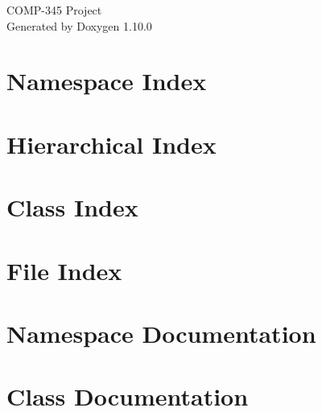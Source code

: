 \documentclass[twoside]{book}
\newcommand{\+}{\discretionary{\mbox{\scriptsize$\hookleftarrow$}}{}{}}
\newcommand{\clearemptydoublepage}{%
    \newpage{\pagestyle{empty}\cleardoublepage}%
  }
\begin{document}
  \raggedbottom
    \hypersetup{pageanchor=false,
                bookmarksnumbered=true,
                pdfencoding=unicode
               }
  \begin{titlepage}
  \vspace*{7cm}
  \begin{center}%
  {\Large COMP-\/345 Project}\\
  \vspace*{1cm}
  {\large Generated by Doxygen 1.10.0}\\
  \end{center}
  \end{titlepage}
  \clearemptydoublepage
  \tableofcontents
  \clearemptydoublepage
  \hypersetup{pageanchor=true}

\chapter{Namespace Index}

\chapter{Hierarchical Index}

\chapter{Class Index}

\chapter{File Index}

\chapter{Namespace Documentation}

\chapter{Class Documentation}




































\end{document}
